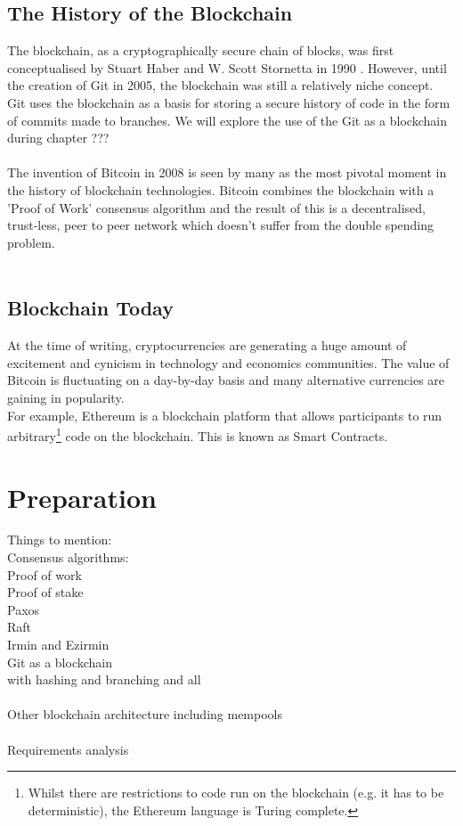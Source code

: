 \documentclass[12pt,a4paper,twoside,openright]{report}
\begin{document}
	\section{The History of the Blockchain}
	The blockchain, as a cryptographically secure chain of blocks, was first conceptualised by Stuart Haber and W. Scott Stornetta in 1990 \cite{HaberStornetta}.
	However, until the creation of Git \cite{Git} in 2005, the blockchain was still a relatively niche concept.\\
	Git uses the blockchain as a basis for storing a secure history of code in the form of commits made to branches.
	We will explore the use of the Git as a blockchain during chapter ??? \\
	\\
	The invention of Bitcoin\cite{Bitcoin} in 2008 is seen by many as the most pivotal moment in the history of blockchain technologies.
	Bitcoin combines the blockchain with a 'Proof of Work' consensus algorithm and the result of this is a decentralised, trust-less, peer to peer network which doesn't suffer from the double spending problem. \\
	\\
	\section{Blockchain Today}
	At the time of writing, cryptocurrencies are generating a huge amount of excitement and cynicism in technology and economics communities. The value of Bitcoin is fluctuating on a day-by-day basis and many alternative currencies are gaining in popularity.\\
	For example, Ethereum is a blockchain platform that allows participants to run arbitrary\footnote{Whilst there are restrictions to code run on the blockchain (e.g. it has to be deterministic), the Ethereum language is Turing complete.} code on the blockchain. This is known as Smart Contracts.

	\chapter{Preparation}
	Things to mention:\\
		Consensus algorithms:\\
		Proof of work\\
		Proof of stake\\
		Paxos\\
		Raft\\
	Irmin and Ezirmin\\
		Git as a blockchain\\
			with hashing and branching and all\\
			\\
	Other blockchain architecture including mempools\\
	\\
	Requirements analysis
	
\end{document}
